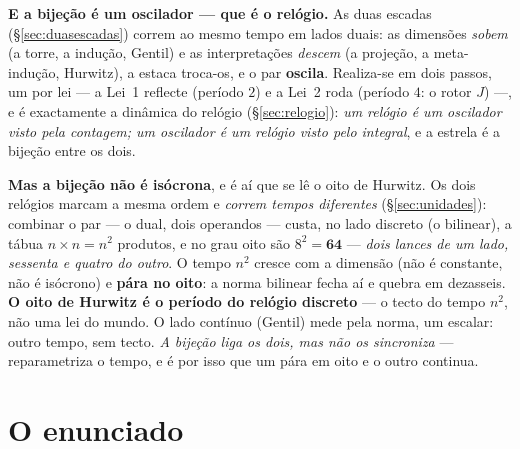 \documentclass[livro.tex]{subfiles}
\begin{document}
\noindent \textbf{E a bijeção é um oscilador --- que é o relógio.} As duas escadas
(\S\ref{sec:duasescadas}) correm ao mesmo tempo em lados duais: as dimensões \emph{sobem} (a torre, a
indução, Gentil) e as interpretações \emph{descem} (a projeção, a meta-indução, Hurwitz), a estaca
troca-os, e o par \textbf{oscila}. Realiza-se em dois passos, um por lei --- a Lei~1 reflecte (período
$2$) e a Lei~2 roda (período $4$: o rotor $J$) ---, e é exactamente a dinâmica do relógio
(\S\ref{sec:relogio}): \emph{um relógio é um oscilador visto pela contagem; um oscilador é um relógio
visto pelo integral}, e a estrela é a bijeção entre os dois.

\smallskip
\noindent \textbf{Mas a bijeção não é isócrona}, e é aí que se lê o oito de Hurwitz. Os dois relógios
marcam a mesma ordem e \emph{correm tempos diferentes} (\S\ref{sec:unidades}): combinar o par --- o
dual, dois operandos --- custa, no lado discreto (o bilinear), a tábua $n\times n=n^2$ produtos, e no
grau oito são $8^2=\mathbf{64}$ --- \emph{dois lances de um lado, sessenta e quatro do outro}. O tempo
$n^2$ cresce com a dimensão (não é constante, não é isócrono) e \textbf{pára no oito}: a norma bilinear
fecha aí e quebra em dezasseis. \textbf{O oito de Hurwitz é o período do relógio discreto} --- o tecto
do tempo $n^2$, não uma lei do mundo. O lado contínuo (Gentil) mede pela norma, um escalar: outro
tempo, sem tecto. \emph{A bijeção liga os dois, mas não os sincroniza} --- reparametriza o tempo, e é
por isso que um pára em oito e o outro continua.



\section{O enunciado}\label{sec:enunciado}
\end{document}
